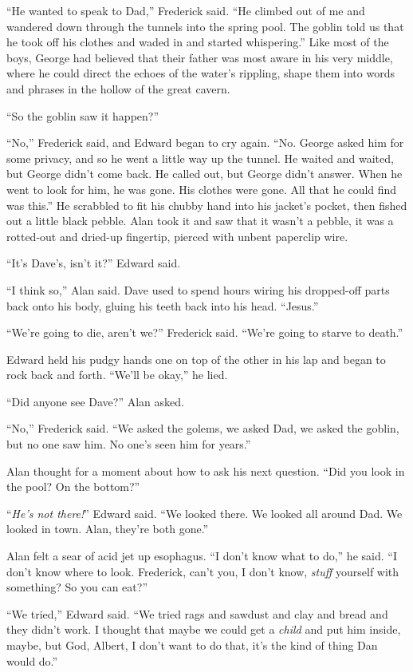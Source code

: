``He wanted to speak to Dad,'' Frederick said.  ``He climbed out of me
and wandered down through the tunnels into the spring pool.  The
goblin told us that he took off his clothes and waded in and started
whispering.'' Like most of the boys, George had believed that their
father was most aware in his very middle, where he could direct the
echoes of the water's rippling, shape them into words and phrases in
the hollow of the great cavern.

``So the goblin saw it happen?''

``No,'' Frederick said, and Edward began to cry again.  ``No.  George
asked him for some privacy, and so he went a little way up the tunnel. 
He waited and waited, but George didn't come back.  He called out, but
George didn't answer.  When he went to look for him, he was gone.  His
clothes were gone.  All that he could find was this.'' He scrabbled to
fit his chubby hand into his jacket's pocket, then fished out a little
black pebble.  Alan took it and saw that it wasn't a pebble, it was a
rotted-out and dried-up fingertip, pierced with unbent paperclip wire.

``It's Dave's, isn't it?'' Edward said.

``I think so,'' Alan said.  Dave used to spend hours wiring his
dropped-off parts back onto his body, gluing his teeth back into his
head.  ``Jesus.''

``We're going to die, aren't we?'' Frederick said.  ``We're going to
starve to death.''

Edward held his pudgy hands one on top of the other in his lap and
began to rock back and forth.  ``We'll be okay,'' he lied.

``Did anyone see Dave?'' Alan asked.

``No,'' Frederick said.  ``We asked the golems, we asked Dad, we asked
the goblin, but no one saw him.  No one's seen him for years.''

Alan thought for a moment about how to ask his next question.  ``Did
you look in the pool?  On the bottom?''

``\textit{He's not there!}'' Edward said.  ``We looked there.  We
looked all around Dad.  We looked in town.  Alan, they're both gone.''

Alan felt a sear of acid jet up esophagus.  ``I don't know what to
do,'' he said.  ``I don't know where to look.  Frederick, can't you, I
don't know, \textit{stuff} yourself with something?  So you can eat?''

``We tried,'' Edward said.  ``We tried rags and sawdust and clay and
bread and they didn't work.  I thought that maybe we could get a
\textit{child} and put him inside, maybe, but God, Albert, I don't
want to do that, it's the kind of thing Dan would do.''

